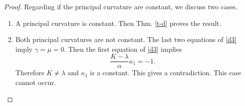 \documentclass[a4paper,12pt]{amsart}
\theoremstyle{definition}
\begin{document}
\begin{proof}

Regarding if the principal curvature are constant, we discuss two cases.
\begin{enumerate}
\item A principal curvature is constant. Then Thm. \ref{t-d} proves the result.
\item Both principal curvatures are not constant.   The last two equations of \eqref{d3} imply $\gamma=\mu=0$.   Then the first equation of \eqref{d3} implies  
$$\frac{K-\lambda}{\alpha}\kappa_1=-1.$$
Therefore $K\not=\lambda$ and $\kappa_1$ is a constant. This gives a contradiction. This case cannot occur. 
\end{enumerate}
\end{proof}

\end{document}
